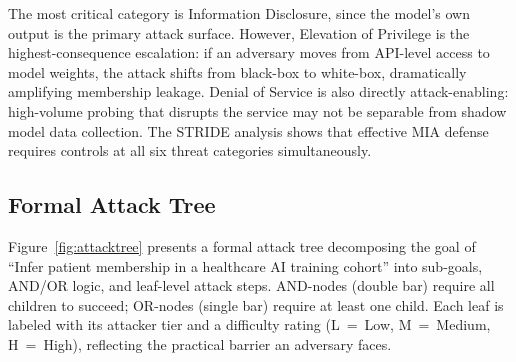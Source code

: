 \documentclass[conference]{IEEEtran}
\begin{document}
	The most critical category is Information Disclosure, since the model's own output is the primary attack surface. However, Elevation of Privilege is the highest-consequence escalation: if an adversary moves from API-level access to model weights, the attack shifts from black-box to white-box, dramatically amplifying membership leakage. Denial of Service is also directly attack-enabling: high-volume probing that disrupts the service may not be separable from shadow model data collection. The STRIDE analysis shows that effective MIA defense requires controls at all six threat categories simultaneously.

	\subsection{Formal Attack Tree}
	Figure~\ref{fig:attacktree} presents a formal attack tree decomposing the goal of ``Infer patient membership in a healthcare AI training cohort'' into sub-goals, AND/OR logic, and leaf-level attack steps. AND-nodes (double bar) require all children to succeed; OR-nodes (single bar) require at least one child. Each leaf is labeled with its attacker tier and a difficulty rating (L~=~Low, M~=~Medium, H~=~High), reflecting the practical barrier an adversary faces.
\end{document}
